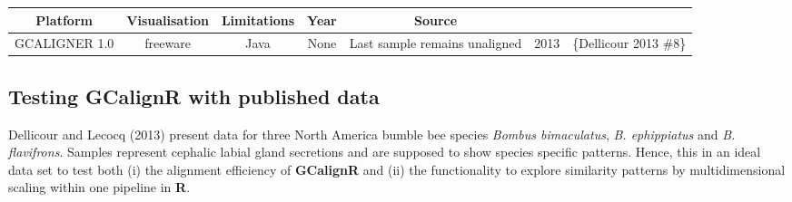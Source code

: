 \documentclass[]{article}
\begin{document}
\begin{longtable}[]{@{}ccccccc@{}}
\begin{minipage}[b]{0.08\columnwidth}
Platform\strut
\end{minipage} & \begin{minipage}[b]{0.12\columnwidth}\centering\strut
Visualisation\strut
\end{minipage} & \begin{minipage}[b]{0.22\columnwidth}\centering\strut
Limitations\strut
\end{minipage} & \begin{minipage}[b]{0.05\columnwidth}\centering\strut
Year\strut
\end{minipage} & \begin{minipage}[b]{0.14\columnwidth}\centering\strut
Source\strut
\end{minipage}\tabularnewline
\midrule
\endhead
\begin{minipage}[t]{0.10\columnwidth}\centering\strut
GCALIGNER 1.0\strut
\end{minipage} & \begin{minipage}[t]{0.11\columnwidth}\centering\strut
freeware\strut
\end{minipage} & \begin{minipage}[t]{0.08\columnwidth}\centering\strut
Java\strut
\end{minipage} & \begin{minipage}[t]{0.12\columnwidth}\centering\strut
None\strut
\end{minipage} & \begin{minipage}[t]{0.22\columnwidth}\centering\strut
Last sample remains unaligned\strut
\end{minipage} & \begin{minipage}[t]{0.05\columnwidth}\centering\strut
2013\strut
\end{minipage} & \begin{minipage}[t]{0.14\columnwidth}\centering\strut
\{Dellicour 2013 \#8\}\strut
\end{minipage}\tabularnewline
\bottomrule
\end{longtable}

\subsection{Testing GCalignR with published
data}\label{testing-gcalignr-with-published-data}

Dellicour and Lecocq (2013) present data for three North America bumble
bee species \emph{Bombus bimaculatus}, \emph{B. ephippiatus} and
\emph{B. flavifrons}. Samples represent cephalic labial gland secretions
and are supposed to show species specific patterns. Hence, this in an
ideal data set to test both (i) the alignment efficiency of
\textbf{GCalignR} and (ii) the functionality to explore similarity
patterns by multidimensional scaling within one pipeline in \textbf{R}.
\end{document}
